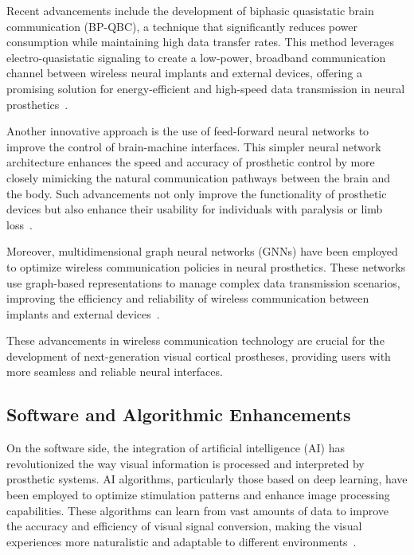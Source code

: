 \documentclass[twocolumn,10pt]{article}
\begin{document}
Recent advancements include the development of biphasic quasistatic brain
communication (BP-QBC), a technique that significantly reduces power consumption
while maintaining high data transfer rates. This method leverages
electro-quasistatic signaling to create a low-power, broadband communication
channel between wireless neural implants and external devices, offering a
promising solution for energy-efficient and high-speed data transmission in
neural prosthetics~\cite{chatterjeeBiphasicQuasistaticBrain2023}.

Another innovative approach is the use of feed-forward neural networks to
improve the control of brain-machine interfaces. This simpler neural network
architecture enhances the speed and accuracy of prosthetic control by more
closely mimicking the natural communication pathways between the brain and the
body. Such advancements not only improve the functionality of prosthetic devices
but also enhance their usability for individuals with paralysis or limb
loss~\cite{willseyRealtimeBrainmachineInterface2022}.

Moreover, multidimensional graph neural networks (GNNs) have been employed to
optimize wireless communication policies in neural prosthetics. These networks
use graph-based representations to manage complex data transmission scenarios,
improving the efficiency and reliability of wireless communication between
implants and external devices~\cite{liuMultidimensionalGraphNeural2024}.

These advancements in wireless communication technology are crucial for the
development of next-generation visual cortical prostheses, providing users with
more seamless and reliable neural interfaces.

\subsection{Software and Algorithmic Enhancements}
On the software side, the integration of artificial intelligence (AI) has
revolutionized the way visual information is processed and interpreted by
prosthetic systems. AI algorithms, particularly those based on deep learning,
have been employed to optimize stimulation patterns and enhance image processing
capabilities. These algorithms can learn from vast amounts of data to improve
the accuracy and efficiency of visual signal conversion, making the visual
experiences more naturalistic and adaptable to different
environments~\cite{romeniMachineLearningFramework2021}.
\end{document}
